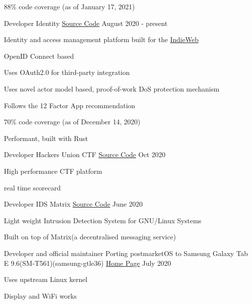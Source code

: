 \begin{cventries}
{\begin{cvitems}
		\item {88\% code coverage  (as of January 17, 2021)}
      \end{cvitems}
    }
  \cventry
    {Developer} %
    {Identity} %
    {\href{https://github.com/shuttlecraft/identity}{Source Code}} %
    {August 2020 - present} %
    {
      \begin{cvitems} %
      	\item {Identity and access management platform built for the \href{https://github.com/shuttlecraft/identity/blob/master/indieweb.org}{IndieWeb}}
		\item {OpenID Connect based}
		\item {Uses OAuth2.0 for third-party integration}
		\item {Uses novel actor model based, proof-of-work DoS protection mechanism}
		\item {Follows the 12 Factor App recommendation}
		\item {70\% code coverage  (as of December 14, 2020)}
		\item {Performant, built with Rust}
	  \end{cvitems}
    }
    
  \cventry
    {Developer}
    {Hackers Union CTF}
    {\href{https://github.com/realaravinth/hunion-backend}{Source Code}}
    {Oct 2020}
    {
        \begin{cvitems} %
        \item {High performance CTF platform}
        \item {real time scorecard}
        \end{cvitems}
    }
    
  \cventry
    {Developer}
    {IDS Matrix}
    {\href{https://github.com/realaravinth/ids-matrix}{Source Code}}
    {June 2020}
    {
        \begin{cvitems} %
        \item {Light weight Intrusion Detection System for GNU/Linux Systems}
        \item {Built on top of Matrix(a decentralised messaging service)}
      \end{cvitems}
    }
    
    \cventry
    {Developer and official maintainer}
    {Porting postmarketOS to Samsung Galaxy Tab E 9.6(SM-T561)(samsung-gtle36)}
    {\href{https://wiki.postmarketos.org/wiki/Samsung_Galaxy_Tab_E_9.6_(SM-T561)_(samsung-gtel3g)}{Home Page}}
    {July 2020}
    {
        \begin{cvitems} %
            \item {Uses upstream Linux kernel}
            \item {Display and WiFi works}
        \end{cvitems}
    }
    

\end{cventries}

